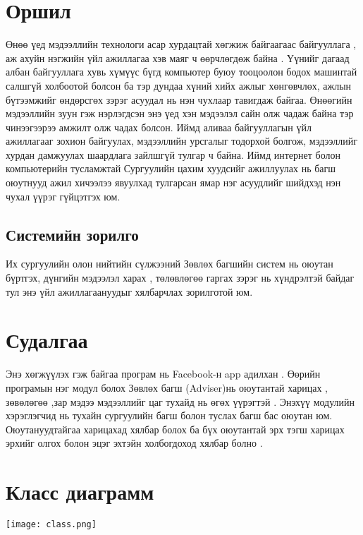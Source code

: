 \documentclass[12pt]{article}
\begin{document}
	\section{Оршил}
   Өнөө үед мэдээллийн технологи асар хурдацтай хөгжиж байгаагаас байгууллага , аж ахуйн нэгжийн 
   үйл ажиллагаа хэв маяг ч өөрчлөгдөж байна . Үүнийг дагаад албан байгууллага хувь хүмүүс бүгд 
   компьютер буюу тооцоолон бодох машинтай салшгүй холбоотой болсон  ба тэр дундаа хүний хийх ажлыг хөнгөвчлөх,
   ажлын бүтээмжийг өндөрсгөх зэрэг асуудал нь нэн чухлаар тавигдаж байгаа. 
   Өнөөгийн мэдээллийн зуун гэж нэрлэгдсэн энэ үед хэн мэдээлэл сайн олж чадаж байна тэр чинээгээрээ амжилт олж чадах болсон.
   Иймд аливаа байгууллагын үйл ажиллагааг зохион байгуулах, мэдээллийн урсгалыг тодорхой болгож, мэдээллийг хурдан дамжуулах
   шаардлага зайлшгүй тулгар ч байна. Иймд интернет болон компьютерийн тусламжтай Сургуулийн цахим хуудсийг ажиллуулах нь
   багш оюутнууд ажил хичээлээ явуулхад тулгарсан ямар нэг асуудлийг шийдхэд нэн чухал үүрэг гүйцэтгэх юм.
   
   \subsection{Системийн зорилго}
    Их сургуулийн олон нийтийн сүлжээний Зөвлөх багшийн систем нь оюутан бүртгэх, дүнгийн мэдээлэл харах , төлөвлөгөө гаргах зэрэг нь хүндрэлтэй байдаг тул энэ үйл ажиллагаануудыг хялбарчлах зорилготой юм.
   	\section{Судалгаа}
       Энэ хөгжүүлэх гэж байгаа програм  нь Facebook-н app адилхан . Өөрийн програмын нэг модул болох 
      Зөвлөх багш (Adviser)нь оюутантай харицах , зөвөлөгөө ,зар мэдээ мэдээллийг цаг тухайд нь өгөх үүрэгтэй .
      Энэхүү модулийн хэрэглэгчид нь тухайн сургуулийн багш болон туслах багш бас оюутан юм. Оюутануудтайгаа харицахад 
      хялбар болох ба бүх оюутантай эрх тэгш харицах эрхийг олгох  болон эцэг эхтэйн холбогдоход хялбар болно . 
   
	\section{Класс диаграмм}
\texttt{[image: class.png]} 
   	
\end{document}
